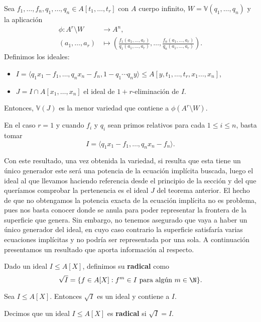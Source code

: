 \begin{teorema}\label{t:implicitRac}
    Sea $f_1,\dots, f_n, q_1,\dots, q_n \in A[t_1, \dots, t_r]$ con $A$ cuerpo infinito, $W=\mathbb{V}(q_1,\dots, q_n)$ y la aplicación
    \begin{align*}
        \phi \colon A^r\setminus W  & \to A^n,\\
        (a_1,\dots, a_r) & \mapsto \left( \frac{f_1(a_1,\dots, a_r)}{q_1(a_1,\dots, a_r)}, \dots, \frac{f_n(a_1,\dots, a_r)}{q_n(a_1,\dots, a_r)}\right).
    \end{align*}
     Definimos los ideales:
    \begin{itemize}
        \item $I = \langle q_1x_1-f_1,\dots,  q_nx_n-f_n, 1-q_1\cdots q_ny\rangle \le A[y,t_1,\dots, t_r,x_1\dots, x_n]$,
        \item $J = I\cap A[x_1,\dots, x_n]$ el ideal de $1+r$-eliminación de $I$.
    \end{itemize}
    Entonces, $\mathbb{V}(J)$ es la menor variedad que contiene a $\phi(A^r\setminus W)$.
\end{teorema}

\begin{observacion}
    En el caso $r=1$ y cuando $f_i$ y $q_i$ sean primos relativos para cada $1\le i \le n$, basta tomar
    $$I = \langle q_1x_1-f_1,\dots,  q_nx_n-f_n\rangle.$$
\end{observacion}

Con este resultado, una vez obtenida la variedad, si resulta que esta tiene un único generador este será una potencia de la ecuación implícita buscada, luego el ideal al que llevamos haciendo referencia desde el principio de la sección y del que queríamos comprobar la pertenencia es el ideal $J$ del teorema anterior. El hecho de que no obtengamos la potencia exacta de la ecuación implícita no es problema, pues nos basta conocer donde se anula para poder representar la frontera de la superficie que genera. Sin embargo, no tenemos asegurado que vaya a haber un único generador del ideal, en cuyo caso contrario la superficie satisfaría varias ecuaciones implícitas y no podría ser representada por una sola. A continuación presentamos un resultado que aporta información al respecto.

\begin{definicion}
    Dado un ideal $I\le A[X]$, definimos su \textbf{radical} como
    \begin{equation*}
        \sqrt{I} = \{f\in A[X] : f^m\in I \text{ para algún } m\in \N\}.
    \end{equation*}
\end{definicion}
\begin{proposicion}
    Sea $I\le A[X]$. Entonces $\sqrt{I}$ es un ideal y contiene a $I$.
\end{proposicion}
\begin{definicion}
    Decimos que un ideal $I\le A[X]$ es \textbf{radical} si $\sqrt{I} = I$.
\end{definicion}

